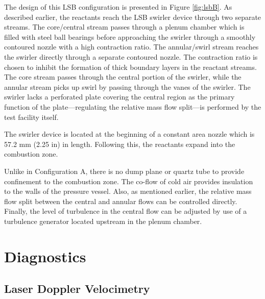 

The design of this LSB configuration is presented in Figure \ref{fig:lsbB}.
As described earlier, the reactants reach the LSB swirler device through two separate streams.
The core/central stream passes through a plenum chamber which is filled with steel ball bearings before approaching the swirler through a smoothly contoured nozzle with a high contraction ratio.
The annular/swirl stream reaches the swirler directly through a separate contoured nozzle.
The contraction ratio is chosen to inhibit the formation of thick boundary layers in the reactant streams.
The core stream passes through the central portion of the swirler, while the annular stream picks up swirl by passing through the vanes of the swirler.
The swirler lacks a perforated plate covering the central region as the primary function of the plate---regulating the relative mass flow split---is performed by the test facility itself.

The swirler device is located at the beginning of a constant area nozzle which is 57.2 mm (2.25 in) in length.
Following this, the reactants expand into the combustion zone.

Unlike in Configuration A, there is no dump plane or quartz tube to provide confinement to the combustion zone.
The co-flow of cold air provides insulation to the walls of the pressure vessel.
Also, as mentioned earlier, the relative mass flow split between the central and annular flows can be controlled directly.
Finally, the level of turbulence in the central flow can be adjusted by use of a turbulence generator\cite{2011-marshall} located upstream in the plenum chamber.

\section{Diagnostics}
\label{sec:experimental-diagnostics}

\subsection{Laser Doppler Velocimetry}
\label{subsec:experimental-laser-doppler-velocimetry}



